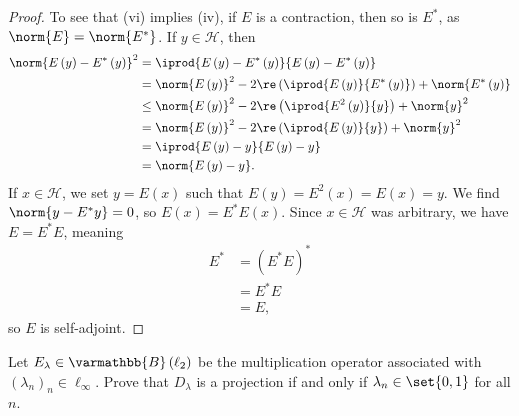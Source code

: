 \documentclass[10pt]{mypackage}
\renewcommand*{\mathbb}[1]{\varmathbb{#1}}
\newcommand{\B}{\mathbb{B}}
\begin{document}
\begin{proof}
  To see that (vi) implies (iv), if $E$ is a contraction, then so is $E^{\ast}$, as $\norm{E} = \norm{E^{\ast}}$. If $y\in \mathcal{H}$, then
  \begin{align*}
    \norm{E\left(y\right) - E^{\ast}\left(y\right)}^2 &= \iprod{E\left(y\right) - E^{\ast}\left(y\right)}{E\left(y\right)-E^{\ast}\left(y\right)}\\
                                                      &= \norm{E\left(y\right)}^2 - 2\re\left( \iprod{E\left(y\right)}{E^{\ast}\left(y\right)}\right) + \norm{E^{\ast}\left(y\right)}\\
                                                      &\leq \norm{E\left(y\right)}^2 - 2\re\left( \iprod{E^2\left(y\right)}{y}\right) + \norm{y}^2\\
                                                      &= \norm{E\left(y\right)}^2 - 2\re\left( \iprod{E\left(y\right)}{y}\right)+ \norm{y}^2\\
                                                      &= \iprod{E\left(y\right) - y}{E\left(y\right)-y}\\
                                                      &= \norm{E\left(y\right) - y}.
  \end{align*}
  If $x\in \mathcal{H}$, we set $y = E\left(x\right)$ such that $E\left(y\right) = E^2\left(x\right) = E\left(x\right) = y$. We find $\norm{y - E^{\ast}y} = 0$, so $E\left(x\right) = E^{\ast}E\left(x\right)$. Since $x\in \mathcal{H}$ was arbitrary, we have $E = E^{\ast}E$, meaning
  \begin{align*}
    E^{\ast} &= \left(E^{\ast}E\right)^{\ast}\\
             &= E^{\ast}E\\
             &= E,
  \end{align*}
  so $E$ is self-adjoint.
\end{proof}
\begin{exercise}
  Let $E_{\lambda}\in \B\left(\ell_2\right)$ be the multiplication operator associated with $\left(\lambda_n\right)_n\in \ell_{\infty}$. Prove that $D_{\lambda}$ is a projection if and only if $\lambda_n\in \set{0,1}$ for all $n$.
\end{exercise}
\end{document}
